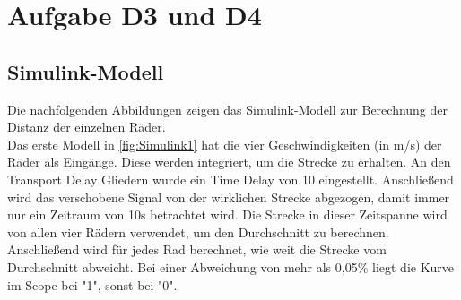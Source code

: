 \chapter{Aufgabe D3 und D4}

\section{Simulink-Modell}
Die nachfolgenden Abbildungen zeigen das Simulink-Modell zur Berechnung der Distanz der einzelnen Räder.\\
Das erste Modell in \autoref{fig:Simulink1} hat die vier Geschwindigkeiten (in m/s) der Räder als Eingänge. Diese werden integriert, um die Strecke zu erhalten. An den Transport Delay Gliedern wurde ein Time Delay von 10 eingestellt. Anschließend wird das verschobene Signal von der wirklichen Strecke abgezogen, damit immer nur ein Zeitraum von 10s betrachtet wird. Die Strecke in dieser Zeitspanne wird von allen vier Rädern verwendet, um den Durchschnitt zu berechnen. Anschließend wird für jedes Rad berechnet, wie weit die Strecke vom Durchschnitt abweicht. Bei einer Abweichung von mehr als 0,05\% liegt die Kurve im Scope bei "1", sonst bei "0".

